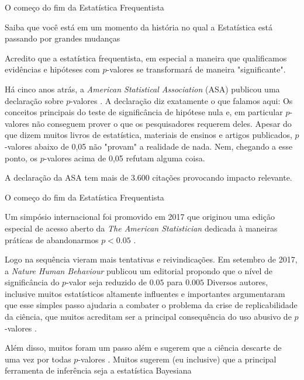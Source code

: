 \begin{frame}{O começo do fim da Estatística Frequentista}
    \begin{vfilleditems}
        \small
        \item Saiba que você está em um momento da história no qual a Estatística está passando por grandes mudanças
        \item Acredito que a estatística frequentista, em especial a maneira que qualificamos evidências e hipóteses
        com $p$-valores se transformará de maneira "significante".
        \item Há cinco anos atrás, a \textit{American Statistical Association} (ASA) publicou uma declaração sobre
        $p$-valores \parencite{Wasserstein2016}. A declaração diz exatamente o que falamos aqui: Os conceitos principais do teste de significância de hipótese nula e, em particular $p$-valores não conseguem prover o que os pesquisadores requerem deles. Apesar do que dizem muitos livros de estatística, materiais de ensinos e artigos publicados, $p$-valores abaixo de 0,05 não "provam" a realidade de nada. Nem, chegando a esse ponto, os $p$-valores acima de 0,05 refutam alguma coisa.
        \item A declaração da ASA tem mais de 3.600 citações provocando impacto relevante.
    \end{vfilleditems}
\end{frame}

\begin{frame}{O começo do fim da Estatística Frequentista}
    \begin{vfilleditems}
        \small
        \item Um simpósio internacional foi promovido em 2017 que originou uma edição especial de acesso aberto da
        \textit{The American Statistician} dedicada à maneiras práticas de abandonarmos $p < 0.05$
        \parencite{wassersteinMovingWorld052019}.
        \item Logo na sequência vieram mais tentativas e reivindicações.
        Em setembro de 2017, a \textit{Nature Human Behaviour} publicou um editorial propondo que o nível de
        significância do $p$-valor seja reduzido de $0.05$ para $0.005$ \parencite{benjaminRedefineStatisticalSignificance2018}
        Diversos autores, inclusive muitos estatísticos altamente influentes e importantes argumentaram que esse simples passo
        ajudaria a combater o problema da crise de replicabilidade da ciência, que muitos acreditam ser a principal
        consequência do uso abusivo de $p$-valores \parencite{Ioannidis2019}.
        \item Além disso, muitos foram um passo além e sugerem que a ciência descarte de uma vez por todas $p$-valores
        \parencite{ItTimeTalk2019,lakensJustifyYourAlpha2018}. Muitos sugerem (eu inclusive) que a principal ferramenta
        de inferência seja a estatística Bayesiana \parencite{amrheinScientistsRiseStatistical2019, Goodman1180, vandeschootBayesianStatisticsModelling2021}
    \end{vfilleditems}
\end{frame}
